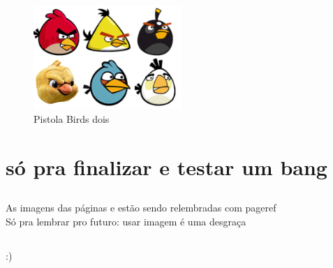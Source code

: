 \documentclass[a4paper,11pt]{report}
\begin{document}
\begin{figure}
\includegraphics[width=0.5\textwidth]{Pistola_Birds.png}
\caption{Pistola Birds dois}\label{imagemultima}
\end{figure}
\chapter{só pra finalizar e testar um bang}
\section{}
As imagens das páginas \pageref{imagemultima} e \pageref{imagemprimeira} estão sendo relembradas com pageref\\
Só pra lembrar pro futuro: usar imagem é uma desgraça\\
\section{}
:)
\end{document}
